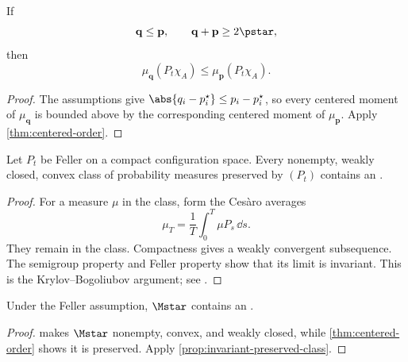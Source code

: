 \begin{corollary}
\label{cor:reflected-product-comparison}
If
\[
  \mathbf q\le\mathbf p,
  \qquad
  \mathbf q+\mathbf p\ge2\pstar,
\]
then
\[
  \mu_{\mathbf q}(P_t\chi_A)
  \le
  \mu_{\mathbf p}(P_t\chi_A).
\]
\end{corollary}

\begin{proof}
The assumptions give
\(\abs{q_i-p_i^\star}\le p_i-p_i^\star\), so every centered moment of
\(\mu_{\mathbf q}\) is bounded above by the corresponding centered
moment of \(\mu_{\mathbf p}\). Apply
\cref{thm:centered-order}.
\end{proof}

\begin{proposition}
\label{prop:invariant-preserved-class}
Let \(P_t\) be Feller on a compact configuration space. Every nonempty,
weakly closed, convex class of probability measures preserved by
\((P_t)\) contains an \invariantmeasure.
\end{proposition}

\begin{proof}
For a measure \(\mu\) in the class, form the Cesàro averages
\[
  \mu_T=\frac1T\int_0^T\mu P_s\,\dd s.
\]
They remain in the class. Compactness gives a weakly convergent
subsequence. The semigroup property and Feller property show that its
limit is invariant. This is the Krylov--Bogoliubov argument; see
\citet{liggett1985}.
\end{proof}

\begin{corollary}
\label{cor:invariant-in-Mstar}
Under the Feller assumption, \(\Mstar\) contains an
\invariantmeasure.
\end{corollary}

\begin{proof}
 makes \(\Mstar\) nonempty, convex, and
weakly closed, while \cref{thm:centered-order} shows it is preserved.
Apply \cref{prop:invariant-preserved-class}.
\end{proof}
